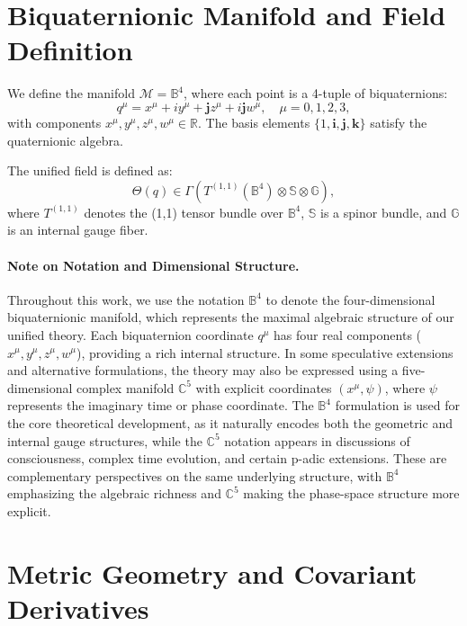 \documentclass[12pt]{article}
\begin{document}
\section{Biquaternionic Manifold and Field Definition}

We define the manifold \( \mathcal{M} = \mathbb{B}^4 \), where each point is a 4-tuple of biquaternions:
\[
q^\mu = x^\mu + i y^\mu + \mathbf{j} z^\mu + i \mathbf{j} w^\mu, \quad \mu = 0,1,2,3,
\]
with components \( x^\mu, y^\mu, z^\mu, w^\mu \in \mathbb{R} \). The basis elements \( \{1, \mathbf{i}, \mathbf{j}, \mathbf{k}\} \) satisfy the quaternionic algebra.

The unified field is defined as:
\[
\Theta(q) \in \Gamma \left( T^{(1,1)}(\mathbb{B}^4) \otimes \mathbb{S} \otimes \mathbb{G} \right),
\]
where \( T^{(1,1)} \) denotes the (1,1) tensor bundle over \( \mathbb{B}^4 \), \( \mathbb{S} \) is a spinor bundle, and \( \mathbb{G} \) is an internal gauge fiber.

\paragraph{Note on Notation and Dimensional Structure.}
Throughout this work, we use the notation \( \mathbb{B}^4 \) to denote the four-dimensional biquaternionic manifold, which represents the maximal algebraic structure of our unified theory. Each biquaternion coordinate \( q^\mu \) has four real components (\( x^\mu, y^\mu, z^\mu, w^\mu \)), providing a rich internal structure. In some speculative extensions and alternative formulations, the theory may also be expressed using a five-dimensional complex manifold \( \mathbb{C}^5 \) with explicit coordinates \( (x^\mu, \psi) \), where \( \psi \) represents the imaginary time or phase coordinate. The \( \mathbb{B}^4 \) formulation is used for the core theoretical development, as it naturally encodes both the geometric and internal gauge structures, while the \( \mathbb{C}^5 \) notation appears in discussions of consciousness, complex time evolution, and certain p-adic extensions. These are complementary perspectives on the same underlying structure, with \( \mathbb{B}^4 \) emphasizing the algebraic richness and \( \mathbb{C}^5 \) making the phase-space structure more explicit.

\section{Metric Geometry and Covariant Derivatives}
\end{document}
